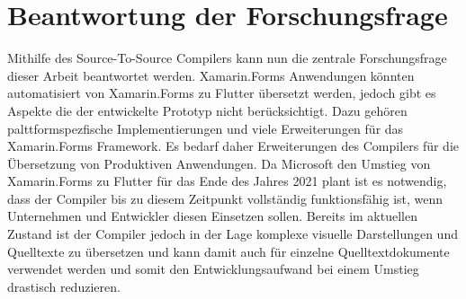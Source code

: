 \section{Beantwortung der Forschungsfrage}
Mithilfe des Source-To-Source Compilers kann nun die zentrale Forschungsfrage dieser Arbeit beantwortet werden.  Xamarin.Forms Anwendungen könnten automatisiert von Xamarin.Forms zu Flutter übersetzt werden,  jedoch gibt es Aspekte die der entwickelte Prototyp nicht berücksichtigt.  Dazu gehören palttformspezfische Implementierungen und viele Erweiterungen für das Xamarin.Forms Framework.  Es bedarf daher Erweiterungen des Compilers für die Übersetzung von Produktiven Anwendungen.  Da Microsoft den Umstieg von Xamarin.Forms zu Flutter für das Ende des Jahres 2021 plant ist es notwendig,  dass der Compiler bis zu diesem Zeitpunkt vollständig funktionsfähig ist,  wenn Unternehmen und Entwickler diesen Einsetzen sollen.  Bereits im aktuellen Zustand ist der Compiler jedoch in der Lage komplexe visuelle Darstellungen und Quelltexte zu übersetzen und kann damit auch für einzelne Quelltextdokumente verwendet werden und somit den Entwicklungsaufwand bei einem Umstieg drastisch reduzieren. 

